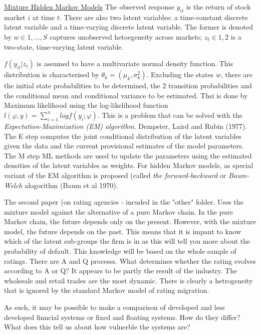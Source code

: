 \documentclass[12pt, a4paper, oneside]{article} %
\begin{document}
\href{http://members.home.nl/jeroenvermunt/dias2010.pdf}{Mixture Hidden Markov Models}  The observed response $y_{it}$ is the return of stock market $i$ at time $t$.  There are also two latent variables:  a time-constant discrete latent variable and a time-varying discrete latent variable.  The former is denoted by $w \in {1, \dots, S}$ captures unobserved hetoegeneity across markets; $z_t \in {1,2}$ is a two-state, time-varying latent variable. 

$f(y_{it}|z_t)$ is assumed to have a multivariate normal density function. This distribution is characterised by $\theta_k = (\mu_k, \sigma_k^2)$.  Excluding the states $w$, there are the initial state probabilities to be determined, the 2 transition probabilities and the conditional mean and conditional variance to be estimated.  Thsi is done by Maximum likelihood using the log-likelihood function $l(\varphi, y) = \sum_{i=1}^n log f(y_i; \varphi)$. This is a problem that can be solved with the \emph{Expectation-Maximization (EM) algorithm}.  Dempster, Laird and Rubin (1977).  The E step computes the joint conditional distribution of the latent variables given the data and the current provisional estimates of the model parameters. The M step ML methods are used to update the parameters using the estimated densities of the latent variables as weights. For hidden Markov models, as special variant of the EM algorithm is proposed (called \emph{the forward-backward} or \emph{Baum-Welch} alogorithm (Baum et al 1970).   

The second paper (on rating agencies - incuded in the "other" folder.  Uses the mixture model against the alternative of a pure Markov chain. In the pure Markov chain, the future depends only on the present.  However, with the mixture model, the future depends on the past.  This means that it is impant to know which of the latent sub-groups the firm is in as this will tell you more about the probability of default.  This knowledge will be based on the whole sample of ratings. There are A and Q processs.  What determines whether the rating evolves according to A or Q?  It appears to be partly the result of the industry.  The wholesale and retail trades are the most dynamic. There is clearly a hetrogeneity that is ignored by the standard Markov model of rating migration. 

As such, it may be possible to make a comparison of developed and less developed finncial systems or fixed and floating systems.  How do they differ?  What does this tell us about how vulnerble the systems are?  
\end{document}
